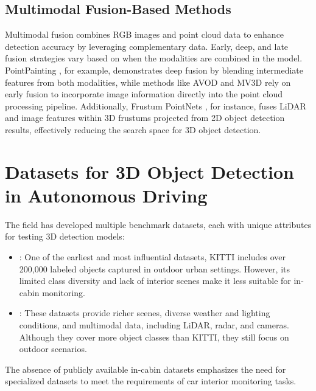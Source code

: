 \subsection{Multimodal Fusion-Based Methods}
Multimodal fusion combines RGB images and point cloud data to enhance detection 
accuracy by leveraging complementary data. Early, deep, and late fusion 
strategies vary based on when the modalities are combined in the model. 
PointPainting \cite{pointpainting}, for example, demonstrates 
deep fusion by blending intermediate features from both modalities, 
while methods like AVOD \cite{avod} and 
MV3D \cite{mv3d} 
rely on early fusion to incorporate image information directly into the point 
cloud processing pipeline. 
Additionally, Frustum PointNets \cite{frustum_pointnet}, for instance, 
fuses LiDAR and image features within 3D frustums projected from 2D object 
detection results, effectively reducing the search space for 3D object detection. 


\section{Datasets for 3D Object Detection in Autonomous Driving}
The field has developed multiple benchmark datasets, each with unique attributes 
for testing 3D detection models:
\begin{itemize}
    \item {}: One of the earliest and most influential datasets, 
    KITTI \cite{kitti} 
    includes over 200,000 labeled objects captured in outdoor urban settings. 
    However, its limited class diversity and lack of interior scenes make it 
    less suitable for in-cabin monitoring.
    \item {} \cite{nuscenes} \cite{waymo}: 
    These datasets provide richer scenes, diverse weather and lighting 
    conditions, and multimodal data, including LiDAR, radar, and cameras. 
    Although they cover more object classes than KITTI, they still focus on 
    outdoor scenarios.
\end{itemize}
The absence of publicly available in-cabin datasets emphasizes the need 
for specialized datasets to meet the requirements of car interior 
monitoring tasks.


